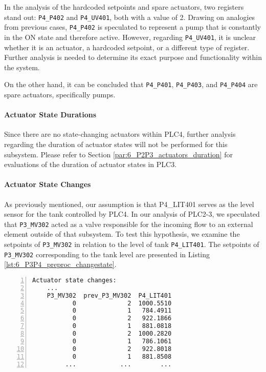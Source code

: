 \bigskip
In the analysis of the hardcoded setpoints and spare actuators, two registers stand out: \texttt{P4\_P402} and \texttt{P4\_UV401}, both with a value of 2. Drawing on analogies from previous cases, \texttt{P4\_P402} is speculated to represent a pump that is constantly in the ON state and therefore active. However, regarding \texttt{P4\_UV401}, it is unclear whether it is an actuator, a hardcoded setpoint, or a different type of register. Further analysis is needed to determine its exact purpose and functionality within the system.

On the other hand, it can be concluded that \texttt{P4\_P401}, \texttt{P4\_P403}, and \texttt{P4\_P404} are spare actuators, specifically pumps. 

\paragraph{Actuator State Durations}
\label{par:6_P3P4_actuators_duration}
Since there are no state-changing actuators within PLC4, further analysis regarding the duration of actuator states will not be performed for this subsystem. Please refer to Section \ref{par:6_P2P3_actuators_duration} for evaluations of the duration of actuator states in PLC3.

\paragraph{Actuator State Changes}
\label{par:6_preproc_P3P4_actuator_state_changes}
As previously mentioned, our assumption is that P4\_LIT401 serves as the level sensor for the tank controlled by PLC4. In our analysis of PLC2-3, we speculated that \texttt{P3\_MV302} acted as a valve responsible for the incoming flow to an external element outside of that subsystem. To test this hypothesis, we examine the setpoints of \texttt{P3\_MV302} in relation to the level of tank \texttt{P4\_LIT401}. The setpoints of \texttt{P3\_MV302} corresponding to the tank level are presented in Listing \ref{lst:6_P3P4_preproc_changestate}.

\begin{lstlisting}[language=bash, numbers=left, caption=\texttt{P3\_MV302} state changes in relation to \texttt{P4\_LIT401}, label=lst:6_P3P4_preproc_changestate]
	Actuator state changes:
	...
	P3_MV302  prev_P3_MV302  P4_LIT401
	       0              2  1000.5510
	       0              1   784.4911
	       0              2   922.1866
	       0              1   881.0818
	       0              2  1000.2820
	       0              1   786.1061
	       0              2   922.8018
	       0              1   881.8508
	     ...            ...        ...
\end{lstlisting}

